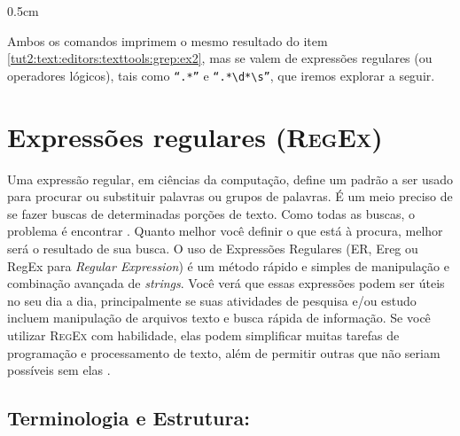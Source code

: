 \begin{refsection}
\begin {myindentpar}{0.5cm}
\begin{enumerate}[\itshape i.]
Ambos os comandos imprimem o mesmo resultado do item \ref{tut2:text:editors:texttools:grep:ex2}, mas se valem de expressões regulares (ou operadores lógicos), tais como \texttt{``.*''} e \texttt{``.*\textbackslash d*\textbackslash s''}, que iremos explorar a seguir.


\end{enumerate}
\end{myindentpar}

\section{Expressões regulares (\textsc{RegEx})}\label{tut2:regex}
Uma expressão regular, em ciências da computação, define um padrão a ser usado para procurar ou substituir palavras ou grupos de palavras.  É um meio preciso de se fazer buscas de determinadas porções de texto. Como todas as buscas, o problema é encontrar \parencite{Wunchiers_2004}. Quanto melhor você definir o que está à procura, melhor será o resultado de sua busca. O uso de Expressões Regulares (ER, Ereg ou RegEx para \textit{Regular Expression}) é um método rápido e simples de manipulação e combinação avançada de \textit{strings}. Você verá que essas expressões podem ser úteis no seu dia a dia, principalmente se suas atividades de pesquisa e/ou estudo incluem manipulação de arquivos texto e busca rápida de informação. Se você utilizar \textsc{RegEx} com habilidade, elas podem simplificar muitas tarefas de programação e processamento de texto, além de permitir outras que não seriam possíveis sem elas \parencite [] [] {Goyvaerts_and_Levitahn_2009}.\\

\subsection{Terminologia e Estrutura:}\label{tut2:regex:structure}


\end{refsection}
